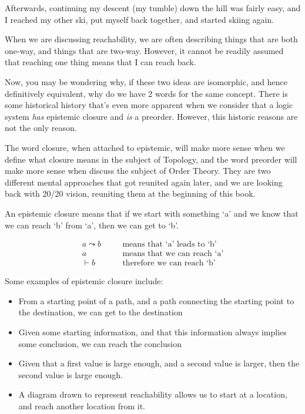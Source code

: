 Afterwards, continuing my descent (my tumble) down the hill was fairly easy, and I reached my other ski, put myself back together, and started skiing again.

When we are discussing reachability, we are often describing things that are both one-way, and things that are two-way. However, it cannot be readily assumed that reaching one thing means that I can reach back.

Now, you may be wondering why, if these two ideas are isomorphic, and hence definitively equivalent, why do we have 2 words for the same concept. There is some historical history that's even more apparent when we consider that a logic system \emph{has} epistemic closure and \emph{is} a preorder. However, this historic reasons are not the only reason.

The word closure, when attached to epistemic, will make more sense when we define what closure means in the subject of Topology, and the word preorder will make more sense when discuss the subject of Order Theory. They are two different mental approaches that got reunited again later, and we are looking back with 20/20 vision, reuniting them at the beginning of this book.

\begin{definition}
An epistemic closure means that if we start with something `a' and we know that we can reach `b' from `a', then we can get to `b'.
\end{definition}

\begin{align*}
    a \leadsto b & \quad & \text{means that `a' leads to `b'} \\
    a & \quad & \text{means that we can reach `a'}\\
    \vdash b & \quad & \text{therefore we can reach `b'}
\end{align*}

Some examples of epistemic closure include:
\begin{itemize}
    \item From a starting point of a path, and a path connecting the starting point to the destination, we can get to the destination
    
    \item Given some starting information, and that this information always implies some conclusion, we can reach the conclusion
    
    \item Given that a first value is large enough, and a second value is larger, then the second value is large enough.
    
    \item A diagram drawn to represent reachability allows us to start at a location, and reach another location from it.
\end{itemize}

